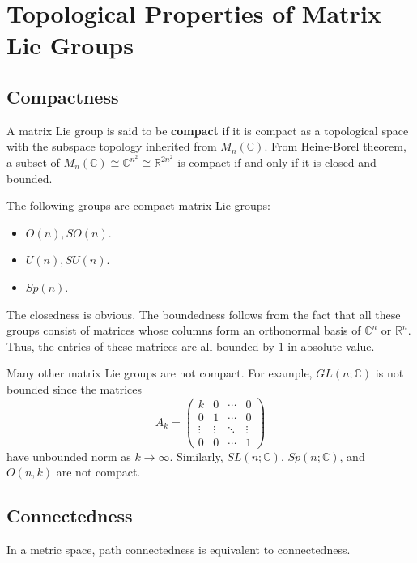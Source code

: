 \documentclass[../main.tex]{subfiles}
\begin{document}

\section{Topological Properties of Matrix Lie Groups}

\subsection{Compactness}

A matrix Lie group is said to be \textbf{compact} if it is compact as a topological space with the subspace topology inherited from $M_n(\mathbb{C})$. From Heine-Borel theorem, a subset of $M_n(\mathbb{C}) \cong \mathbb{C}^{n^2} \cong \mathbb{R}^{2n^2}$ is compact if and only if it is closed and bounded.

The following groups are compact matrix Lie groups:
\begin{itemize}
	\item $O(n), SO(n)$.
	\item $U(n), SU(n)$.
	\item $Sp(n)$.
\end{itemize}
The closedness is obvious. The boundedness follows from the fact that all these groups consist of matrices whose columns form an orthonormal basis of $\mathbb{C}^n$ or $\mathbb{R}^n$. Thus, the entries of these matrices are all bounded by $1$ in absolute value.

Many other matrix Lie groups are not compact. For example, $GL(n;\mathbb{C})$ is not bounded since the matrices
\begin{equation*}
	A_k = \begin{pmatrix}
		k      & 0      & \cdots & 0      \\
		0      & 1      & \cdots & 0      \\
		\vdots & \vdots & \ddots & \vdots \\
		0      & 0      & \cdots & 1
	\end{pmatrix}
\end{equation*}
have unbounded norm as $k \to \infty$. Similarly, $SL(n;\mathbb{C})$, $Sp(n;\mathbb{C})$, and $O(n,k)$ are not compact.

\subsection{Connectedness}
In a metric space, path connectedness is equivalent to connectedness.
\end{document}
